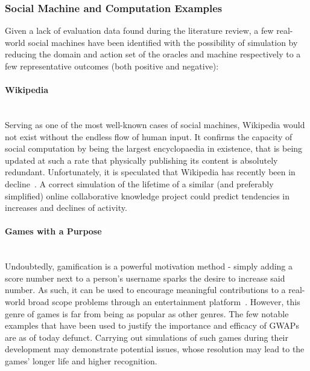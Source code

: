 \documentclass[12pt]{article}
\begin{document}
		
		
			\subsubsection{Social Machine and Computation Examples}
			\label{sec:socialexamples}
			Given a lack of evaluation data found during the literature review, a few real-world social machines have been identified with the possibility of simulation by reducing the domain and action set of the oracles and machine respectively to a few representative outcomes (both positive and negative):
			\paragraph{Wikipedia}\hfill\\
			Serving as one of the most well-known cases of social machines, Wikipedia would not exist without the endless flow of human input. It confirms the capacity of social computation by being the largest encyclopaedia in existence, that is being updated at such a rate that physically publishing its content is absolutely redundant. Unfortunately, it is speculated that Wikipedia has recently been in decline~\cite{simonite2013decline}. A correct simulation of the lifetime of a similar (and preferably simplified) online collaborative knowledge project could predict tendencies in increases and declines of activity.
			\paragraph{Games with a Purpose}\hfill\\
			Undoubtedly, gamification is a powerful motivation method - simply adding a score number next to a person's username sparks the desire to increase said number. As such, it can be used to encourage meaningful contributions to a real-world broad scope problems through an entertainment platform~\cite{Ahn2006}. However, this genre of games is far from being as popular as other genres. The few notable examples that have been used to justify the importance and efficacy of GWAPs~\cite{von2008designing} are as of today defunct. Carrying out simulations of such games during their development may demonstrate potential issues, whose resolution may lead to the games' longer life and higher recognition.	
\end{document}
